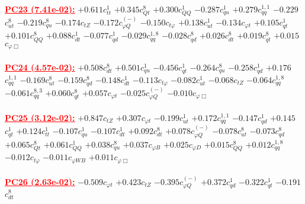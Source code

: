 \documentclass{article}
\begin{document}
\noindent \textcolor{red}{\underline{\bf{PC23} (7.41e-02):}}
{$+0.611$}{\rm $c_{tt}^{1}$}
{$+0.345$}{\rm $c_{Qt}^{8}$}
{$+0.300$}{\rm $c_{QQ}^{1}$}
{$-0.287$}{\rm $c_{qu}^{1}$}
{$+0.279$}{\rm $c_{qq}^{1,1}$}
{$-0.229$}{\rm $c_{ut}^{8}$}
{$-0.219$}{\rm $c_{qu}^{8}$}
{$-0.174$}{\rm $c_{tZ}$}
{$-0.172$}{\rm $c_{\varphi Q}^{(-)}$}
{$-0.150$}{\rm $c_{t \varphi}$}
{$+0.138$}{\rm $c_{ut}^{1}$}
{$-0.134$}{\rm $c_{\varphi t}$}
{$+0.105$}{\rm $c_{qt}^{1}$}
{$+0.101$}{\rm $c_{QQ}^{8}$}
{$+0.088$}{\rm $c_{dt}^{1}$}
{$-0.077$}{\rm $c_{qd}^{1}$}
{$-0.029$}{\rm $c_{qq}^{1,8}$}
{$-0.028$}{\rm $c_{qd}^{8}$}
{$+0.026$}{\rm $c_{dt}^{8}$}
{$+0.019$}{\rm $c_{qt}^{8}$}
{$+0.015$}{\rm $c_{\varphi \Box}$}
 \nonumber \\ \nonumber \\
\noindent \textcolor{red}{\underline{\bf{PC24} (4.57e-02):}}
{$+0.508$}{\rm $c_{dt}^{8}$}
{$+0.501$}{\rm $c_{qu}^{1}$}
{$-0.456$}{\rm $c_{qt}^{1}$}
{$-0.264$}{\rm $c_{qu}^{8}$}
{$-0.258$}{\rm $c_{qd}^{1}$}
{$+0.176$}{\rm $c_{qq}^{1,1}$}
{$-0.169$}{\rm $c_{ut}^{8}$}
{$-0.159$}{\rm $c_{qd}^{8}$}
{$-0.148$}{\rm $c_{dt}^{1}$}
{$-0.113$}{\rm $c_{t \varphi}$}
{$-0.082$}{\rm $c_{ut}^{1}$}
{$-0.068$}{\rm $c_{tZ}$}
{$-0.064$}{\rm $c_{qq}^{1,8}$}
{$-0.061$}{\rm $c_{qq}^{8,3}$}
{$+0.060$}{\rm $c_{qt}^{8}$}
{$+0.057$}{\rm $c_{\varphi t}$}
{$-0.025$}{\rm $c_{\varphi Q}^{(-)}$}
{$-0.010$}{\rm $c_{\varphi \Box}$}
 \nonumber \\ \nonumber \\
\noindent \textcolor{red}{\underline{\bf{PC25} (3.12e-02):}}
{$+0.847$}{\rm $c_{tZ}$}
{$+0.307$}{\rm $c_{\varphi t}$}
{$-0.199$}{\rm $c_{ut}^{1}$}
{$+0.172$}{\rm $c_{qq}^{1,1}$}
{$-0.147$}{\rm $c_{qd}^{1}$}
{$+0.145$}{\rm $c_{qt}^{1}$}
{$+0.124$}{\rm $c_{tt}^{1}$}
{$-0.107$}{\rm $c_{qu}^{1}$}
{$-0.107$}{\rm $c_{dt}^{1}$}
{$+0.092$}{\rm $c_{dt}^{8}$}
{$+0.078$}{\rm $c_{\varphi Q}^{(-)}$}
{$-0.078$}{\rm $c_{ut}^{8}$}
{$-0.073$}{\rm $c_{qd}^{8}$}
{$+0.065$}{\rm $c_{Qt}^{8}$}
{$+0.061$}{\rm $c_{QQ}^{1}$}
{$+0.038$}{\rm $c_{qu}^{8}$}
{$+0.037$}{\rm $c_{\varphi B}$}
{$+0.025$}{\rm $c_{\varphi D}$}
{$+0.015$}{\rm $c_{QQ}^{8}$}
{$+0.012$}{\rm $c_{qq}^{1,8}$}
{$-0.012$}{\rm $c_{t \varphi}$}
{$-0.011$}{\rm $c_{\varphi WB}$}
{$+0.011$}{\rm $c_{\varphi \Box}$}
 \nonumber \\ \nonumber \\
\noindent \textcolor{red}{\underline{\bf{PC26} (2.63e-02):}}
{$-0.509$}{\rm $c_{\varphi t}$}
{$+0.423$}{\rm $c_{tZ}$}
{$-0.395$}{\rm $c_{\varphi Q}^{(-)}$}
{$+0.372$}{\rm $c_{qd}^{1}$}
{$-0.322$}{\rm $c_{qt}^{1}$}
{$-0.191$}{\rm $c_{dt}^{8}$}
\end{document}
